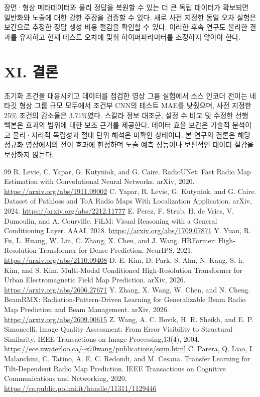 \documentclass[10pt,a4paper]{article}
\begin{document}
장면·형상 메타데이터와 물리 정답을 복원할 수 있는 더 큰 독립 데이터가 확보되면 일반화와 노출에 대한 강한 주장을 검증할 수 있다. 새로 사전 지정한 동일 오차 실험은 보간으로 추정한 정답 생성 비용 절감을 확인할 수 있다. 이러한 후속 연구도 불리한 결과를 유지하고 현재 테스트 오차에 맞춰 하이퍼파라미터를 조정하지 않아야 한다.

\section*{XI. 결론}
초기화 조건을 대응시키고 데이터를 점검한 영상 그룹 실험에서 소스 인코더 전이는 네 타깃 형상 그룹 규모 모두에서 조건부 CNN의 테스트 MAE를 낮췄으며, 사전 지정한 25\% 조건의 감소율은 3.71\%였다. 스칼라 정보 대조군, 설정 수 비교 및 수정한 선행 백본은 효과의 범위에 대한 보조 근거를 제공한다. 데이터 효율 보간은 기술적 분석이고 물리·지리적 독립성과 절대 단위 해석은 미확인 상태이다. 본 연구의 결론은 해당 정규화 영상에서의 전이 효과에 한정하며 노출 예측 성능이나 보편적인 데이터 절감을 보장하지 않는다.

\begin{thebibliography}{99}
 R. Levie, C. Yapar, G. Kutyniok, and G. Caire. RadioUNet: Fast Radio Map Estimation with Convolutional Neural Networks. arXiv, 2020. \url{https://arxiv.org/abs/1911.09002}
 C. Yapar, R. Levie, G. Kutyniok, and G. Caire. Dataset of Pathloss and ToA Radio Maps With Localization Application. arXiv, 2024. \url{https://arxiv.org/abs/2212.11777}
 E. Perez, F. Strub, H. de Vries, V. Dumoulin, and A. Courville. FiLM: Visual Reasoning with a General Conditioning Layer. AAAI, 2018. \url{https://arxiv.org/abs/1709.07871}
 Y. Yuan, R. Fu, L. Huang, W. Lin, C. Zhang, X. Chen, and J. Wang. HRFormer: High-Resolution Transformer for Dense Prediction. NeurIPS, 2021. \url{https://arxiv.org/abs/2110.09408}
 D.-E. Kim, D. Park, S. Ahn, N. Kang, S.-h. Kim, and S. Kim. Multi-Modal Conditioned High-Resolution Transformer for Urban Electromagnetic Field Map Prediction. arXiv, 2026. \url{https://arxiv.org/abs/2606.27671}
 Y. Zhang, X. Wang, W. Chen, and N. Cheng. BeamRMX: Radiation-Pattern-Driven Learning for Generalizable Beam Radio Map Prediction and Beam Management. arXiv, 2026. \url{https://arxiv.org/abs/2609.00615}
 Z. Wang, A. C. Bovik, H. R. Sheikh, and E. P. Simoncelli. Image Quality Assessment: From Error Visibility to Structural Similarity. IEEE Transactions on Image Processing,13(4), 2004. \url{https://ece.uwaterloo.ca/~z70wang/publications/ssim.html}
 C. Parera, Q. Liao, I. Malanchini, C. Tatino, A. E. C. Redondi, and M. Cesana. Transfer Learning for Tilt-Dependent Radio Map Prediction. IEEE Transactions on Cognitive Communications and Networking, 2020. \url{https://re.public.polimi.it/handle/11311/1129446}
\end{thebibliography}
\end{document}
